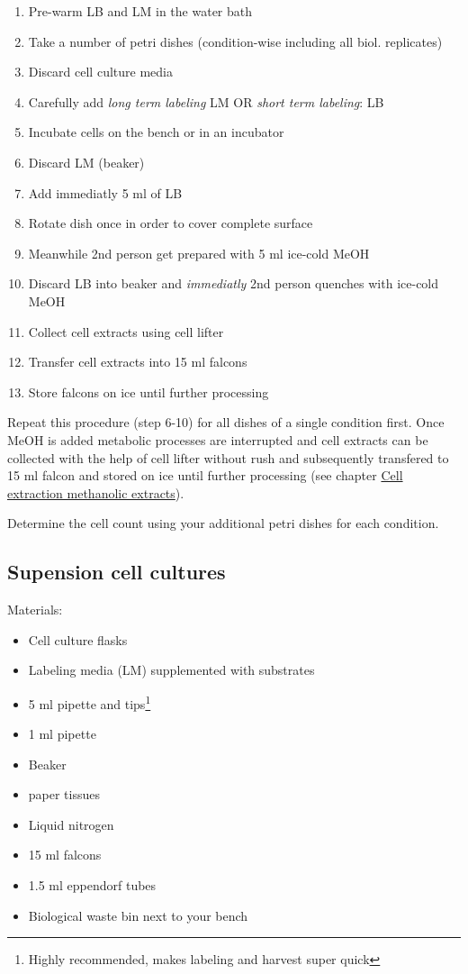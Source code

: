 \documentclass[]{book}
\providecommand{\tightlist}{%
  \setlength{\itemsep}{0pt}\setlength{\parskip}{0pt}}
\let\rmarkdownfootnote\footnote%
\def\footnote{\protect\rmarkdownfootnote}
\begin{document}
\begin{enumerate}
\def\labelenumi{\arabic{enumi}.}
\tightlist
\item
  Pre-warm LB and LM in the water bath
\item
  Take a number of petri dishes (condition-wise including all biol. replicates)
\item
  Discard cell culture media
\item
  Carefully add \emph{long term labeling} LM OR \emph{short term labeling}: LB
\item
  Incubate cells on the bench or in an incubator
\item
  Discard LM (beaker)
\item
  Add immediatly 5 ml of LB
\item
  Rotate dish once in order to cover complete surface
\item
  Meanwhile 2nd person get prepared with 5 ml ice-cold MeOH
\item
  Discard LB into beaker and \emph{immediatly} 2nd person quenches with ice-cold MeOH
\item
  Collect cell extracts using cell lifter
\item
  Transfer cell extracts into 15 ml falcons
\item
  Store falcons on ice until further processing
\end{enumerate}

Repeat this procedure (step 6-10) for all dishes of a single condition first. Once MeOH is added metabolic processes are interrupted and cell extracts can be collected with the help of cell lifter without rush and subsequently transfered to 15 ml falcon and stored on ice until further processing (see chapter \protect\hyperlink{ccextraction_meoh}{Cell extraction methanolic extracts}).

Determine the cell count using your additional petri dishes for each condition.

\hypertarget{psirm:suspension}{%
\subsection{Supension cell cultures}\label{psirm:suspension}}

Materials:

\begin{itemize}
\tightlist
\item
  Cell culture flasks
\item
  Labeling media (LM) supplemented with substrates
\item
  5 ml pipette and tips\footnote{Highly recommended, makes labeling and harvest super quick}
\item
  1 ml pipette
\item
  Beaker
\item
  paper tissues
\item
  Liquid nitrogen
\item
  15 ml falcons
\item
  1.5 ml eppendorf tubes
\item
  Biological waste bin next to your bench
\end{itemize}
\end{document}
